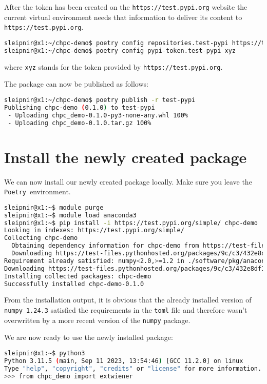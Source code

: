 \documentclass[10pt]{article}
\newcommand{\POETRY}{\texttt{Poetry}}
\begin{document}
After the token has been created on the \texttt{https://test.pypi.org} website the current virtual environment 
needs that information to deliver its content to \texttt{https://test.pypi.org}.
\begin{lstlisting}[language=bash]
sleipnir@x1:~/chpc-demo$ poetry config repositories.test-pypi https://test.pypi.org/legacy/
sleipnir@x1:~/chpc-demo$ poetry config pypi-token.test-pypi xyz
\end{lstlisting}
where \texttt{xyz} stands for the token provided by \texttt{https://test.pypi.org}.

The package can now be published as follows:
\begin{lstlisting}[language=bash]
sleipnir@x1:~/chpc-demo$ poetry publish -r test-pypi
Publishing chpc-demo (0.1.0) to test-pypi
 - Uploading chpc_demo-0.1.0-py3-none-any.whl 100%
 - Uploading chpc_demo-0.1.0.tar.gz 100%
\end{lstlisting}

\section{Install the newly created package}
We can now install our newly created package locally. Make sure you leave the \POETRY\ environment.
\begin{lstlisting}[language=bash]
sleipnir@x1:~$ module purge
sleipnir@x1:~$ module load anaconda3
sleipnir@x1:~$ pip install -i https://test.pypi.org/simple/ chpc-demo
Looking in indexes: https://test.pypi.org/simple/
Collecting chpc-demo
  Obtaining dependency information for chpc-demo from https://test-files.pythonhosted.org/packages/9c/c3/432e8df10a5db0e3d6b6963c41638f8b9e6b7b24d81fd759932e0dfa7d3e/chpc_demo-0.1.0-py3-none-any.whl.metadata
  Downloading https://test-files.pythonhosted.org/packages/9c/c3/432e8df10a5db0e3d6b6963c41638f8b9e6b7b24d81fd759932e0dfa7d3e/chpc_demo-0.1.0-py3-none-any.whl.metadata (664 bytes)
Requirement already satisfied: numpy<2.0,>=1.2 in ./software/pkg/anaconda3/2023.09/lib/python3.11/site-packages (from chpc-demo) (1.24.3)
Downloading https://test-files.pythonhosted.org/packages/9c/c3/432e8df10a5db0e3d6b6963c41638f8b9e6b7b24d81fd759932e0dfa7d3e/chpc_demo-0.1.0-py3-none-any.whl (3.4 kB)
Installing collected packages: chpc-demo
Successfully installed chpc-demo-0.1.0
\end{lstlisting}
From the installation output, it is obvious that the already installed version of \texttt{numpy 1.24.3} satisfied the requirements in the \texttt{toml} file
and therefore wasn't overwritten by a more recent version of the \texttt{numpy} package.

We are now ready to use the newly installed package:
\begin{lstlisting}[language=bash]
sleipnir@x1:~$ python3
Python 3.11.5 (main, Sep 11 2023, 13:54:46) [GCC 11.2.0] on linux
Type "help", "copyright", "credits" or "license" for more information.
>>> from chpc_demo import extwiener
\end{lstlisting}



\end{document}
